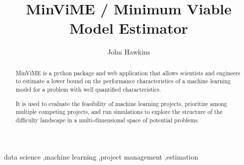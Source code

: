 \documentclass[preprint,12pt, a4paper]{elsarticle}
\begin{document}
\begin{frontmatter}



\title{MinViME / Minimum Viable Model Estimator}


\author{John Hawkins}
\address{Getting-Data-Science-Done.com}

\begin{abstract}
MinViME is a python package and web application that allows scientists and engineers
to estimate a lower bound on the performance characteristics of a machine
learning model for a problem with well quantified characteristics. 

It is used to evaluate the feasibility of machine learning projects, 
prioritize among multiple competing projects, and run simulations to explore the
structure of the difficulty landscape in a multi-dimensional 
space of potential problems.

\end{abstract}

\begin{keyword}
data science \sep machine learning \sep project management \sep estimation



\end{keyword}

\end{frontmatter}
\end{document}
